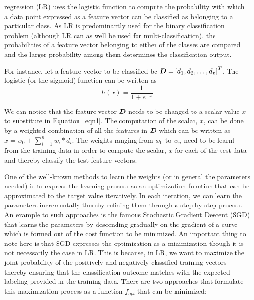  regression (LR) uses the logistic function to compute the probability with which a data point expressed as a feature vector can be classified as belonging to a particular class. As LR is predominantly used for the binary classification problem (although LR can as well be used for multi-classification), the probabilities of a feature vector belonging to either of the classes are compared and the larger probability among them determines the classification output. 

For instance, let a feature vector to be classified be $\boldsymbol{D} = \left[d_1,d_2,\ldots,d_n \right]^T $. The logistic (or the sigmoid) function can be written as 
\begin{equation} 
{h(x) = \frac{1}{1 + e^{-x} } }
\label{eqn1}
\end{equation} 

We can notice that the feature vector $\boldsymbol{D}$ needs to be changed to a scalar value $x$ to substitute in Equation~\ref{eqn1}.  The computation of the scalar, $x$, can be done by a weighted combination of all the features in $\boldsymbol{D}$ which can be written as $ x  = w_0 + \sum_{i=1}^{n} {w_i * d_i}$. The weights ranging from $w_0$ to $w_n$ need to be learnt from the training data in order to compute the scalar, $x$ for each of the test data and thereby classify the test feature vectors. 

One of the well-known methods to learn the weights (or in general the parameters needed) is to express the learning process as an optimization function that can be approximated to the target value iteratively. In each iteration, we can learn the parameters incrementally thereby refining them through a step-by-step process. An example to such approaches is the famous Stochastic Gradient Descent (SGD) that learns the parameters by descending gradually on the gradient of a curve which is formed out of the cost function to be minimized. An important thing to note here is that SGD expresses the optimization as a minimization though it is not necessarily the case in LR. This is because, in LR, we want to maximize the joint probability of the positively and negatively classified training vectors thereby ensuring that the classification outcome matches with the expected labeling provided in the training data. There are two approaches that formulate this maximization process as a function $f_{opt}$ that can be minimized:

